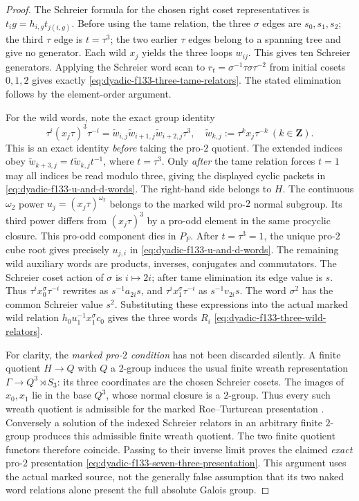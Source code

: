 \documentclass[11pt]{article}
\theoremstyle{definition}
\begin{document}
\begin{proof}
The Schreier formula
for the chosen right
coset representatives is
$t_i g=h_{i,g}t_{j(i,g)}$.
Before using the tame
relation, the three
$\sigma$ edges are
$s_0,s_1,s_2$;
the third $\tau$ edge
is $t=\tau^3$;
the two earlier $\tau$
edges belong to a
spanning tree and
give no generator.
Each wild $x_j$ yields
the three loops $w_{ij}$.
This gives ten
Schreier generators.
Applying the
Schreier word scan to
$r_t=\sigma^{-1}\tau
\sigma\tau^{-2}$ from
initial cosets $0,1,2$
gives exactly
\eqref{eq:dyadic-f133-three-tame-relators}.
The stated elimination
follows by the
element-order argument.

For the wild words, note
the exact group identity
\begin{equation}\label{eq:dyadic-f133-threefold-wild-cycle}
\boxed{\quad
\tau^i(x_j\tau)^3\tau^{-i}
=\widetilde w_{i,j}\widetilde w_{i+1,j}
 \widetilde w_{i+2,j}\tau^3,
\quad
\widetilde w_{k,j}:=
\tau^k x_j\tau^{-k}\ (k\in\mathbf Z).
\quad}
\end{equation}
This is an exact
identity \emph{before}
taking the pro-$2$
quotient.  The
extended indices
obey
$\widetilde w_{k+3,j}
=t\widetilde w_{k,j}t^{-1}$,
where $t=\tau^3$.
Only \emph{after}
the tame relation
forces $t=1$
may all indices
be read modulo three,
giving the displayed
cyclic packets in
\eqref{eq:dyadic-f133-u-and-d-words}.
The right-hand side
belongs to $H$.
The continuous
$\omega_2$ power
$u_j=(x_j\tau)^{\omega_2}$
belongs to the
marked wild
pro-$2$ normal
subgroup.
Its third power
differs from
$(x_j\tau)^3$
by a pro-odd
element in the
same procyclic
closure.  This
pro-odd component
dies in $P_F$.
After $t=\tau^3=1$,
the unique pro-$2$
cube root gives
precisely $u_{j,i}$
in
\eqref{eq:dyadic-f133-u-and-d-words}.
The remaining
wild auxiliary
words are products,
inverses,
conjugates and
commutators.
The Schreier
coset action of
$\sigma$ is
$i\mapsto2i$;
after tame
elimination its
edge value is $s$.
Thus
$\tau^i x_0^\sigma\tau^{-i}$
rewrites as
$s^{-1}a_{2i}s$,
and
$\tau^i x_1^\sigma\tau^{-i}$
as $s^{-1}v_{2i}s$.
The word $\sigma^2$
has the common
Schreier value $s^2$.
Substituting these
expressions into
the actual marked
wild relation
$h_0u_1^{-1}x_1^\sigma c_0$
gives the
three words $R_i$
\eqref{eq:dyadic-f133-three-wild-relators}.

For clarity, the
\emph{marked pro-$2$
condition} has not
been discarded
silently.  A
finite quotient
$H\to Q$ with
$Q$ a $2$-group
induces the usual
finite wreath
representation
$\Gamma\to Q^3\rtimes S_3$:
its three coordinates
are the chosen
Schreier cosets.
The images of
$x_0,x_1$ lie in
the base $Q^3$,
whose normal
closure is a
$2$-group.
Thus every
such wreath
quotient is
admissible for
the marked
Roe--Turturean
presentation
\cite{RoeTurtureanGQ2}.
Conversely a solution
of the indexed
Schreier relators
in an arbitrary
finite $2$-group
produces this
admissible finite
wreath quotient.
The two finite
quotient functors
therefore coincide.
Passing to their
inverse limit proves
the claimed
\emph{exact}
pro-$2$ presentation
\eqref{eq:dyadic-f133-seven-three-presentation}.
This argument uses
the actual marked
source, not the
generally false
assumption that
its two naked
word relations
alone present
the full absolute
Galois group.
\end{proof}
\end{document}
